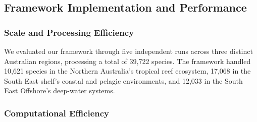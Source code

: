 \subsection{Framework Implementation and Performance}

\subsubsection{Scale and Processing Efficiency}
We evaluated our framework through five independent runs across three distinct Australian regions, processing a total of 39,722 species. The framework handled 10,621 species in the Northern Australia's tropical reef ecosystem, 17,068 in the South East shelf's coastal and pelagic environments, and 12,033 in the South East Offshore's deep-water systems. 

\subsubsection{Computational Efficiency}




